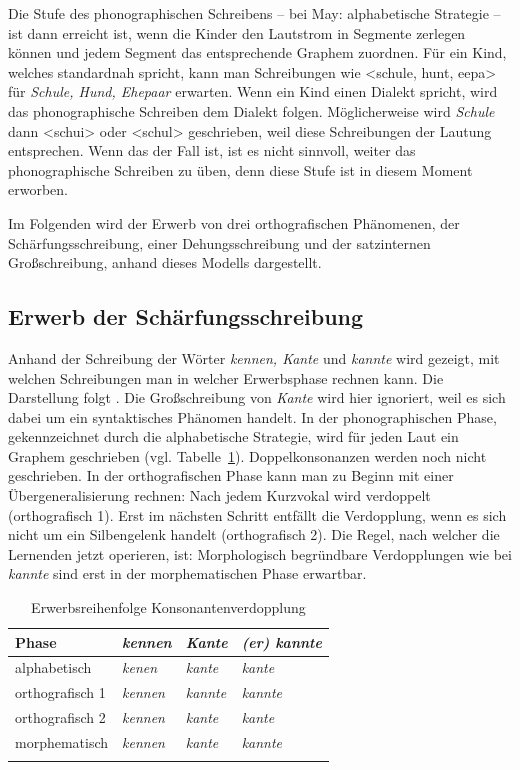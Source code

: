 Die Stufe des phonographischen Schreibens -- bei May: alphabetische Strategie -- ist dann erreicht ist, wenn die Kinder den Lautstrom in Segmente zerlegen können und jedem Segment das entsprechende Graphem zuordnen. Für ein Kind, welches standardnah spricht, kann man Schreibungen wie <schule, hunt, eepa> für \textit{Schule, Hund, Ehepaar} erwarten. Wenn ein Kind einen Dialekt spricht, wird das phonographische Schreiben dem Dialekt folgen. Möglicherweise wird \textit{Schule} dann <schui> oder <schul> geschrieben, weil diese Schreibungen der Lautung entsprechen. Wenn das der Fall ist, ist es nicht sinnvoll, weiter das phonographische Schreiben zu üben, denn diese Stufe ist in diesem Moment erworben.


Im Folgenden wird der Erwerb von drei orthografischen Phänomenen, der Schärfungsschreibung, einer Dehungsschreibung und der satzinternen Großschreibung, anhand dieses Modells dargestellt.

\subsection{Erwerb der Schärfungsschreibung}

Anhand der Schreibung der Wörter \textit{kennen, Kante} und \textit{kannte} wird gezeigt, mit welchen Schreibungen man in welcher Erwerbsphase rechnen kann. Die Darstellung folgt \citet[170--172]{Thome1999}. Die Großschreibung von \textit{Kante} wird hier ignoriert, weil es sich dabei um ein syntaktisches Phänomen handelt. In der phonographischen Phase, gekennzeichnet durch die alphabetische Strategie, wird für jeden Laut ein Graphem geschrieben (vgl. Tabelle~\ref{tab:kennenkanntekante}). Doppelkonsonanzen werden noch nicht geschrieben. In der orthografischen Phase kann man zu Beginn mit einer Übergeneralisierung rechnen: Nach jedem Kurzvokal wird verdoppelt (orthografisch 1). Erst im nächsten Schritt entfällt die Verdopplung, wenn es sich nicht um ein Silbengelenk handelt (orthografisch 2). Die Regel, nach welcher die Lernenden jetzt operieren, ist:  Morphologisch begründbare Verdopplungen wie bei \textit{kannte} sind erst in der morphematischen Phase erwartbar.

\begin{table}
\caption{\label{tab:kennenkanntekante} Erwerbsreihenfolge Konsonantenverdopplung}
\begin{tabular}{llll}
\lsptoprule
 Phase & \textit{kennen} & \textit{Kante} & \textit{(er) kannte}\\
  \midrule
alphabetisch     & \textit{kenen} & \textit{kante} & \textit{kante} \\
orthografisch 1     & \textit{kennen} & \textit{kannte} & \textit{kannte}\\
orthografisch 2 & \textit{kennen} & \textit{kante} & \textit{kante}\\
morphematisch & \textit{kennen} & \textit{kante} & \textit{kannte}\\
\lspbottomrule
\end{tabular}
\end{table}


